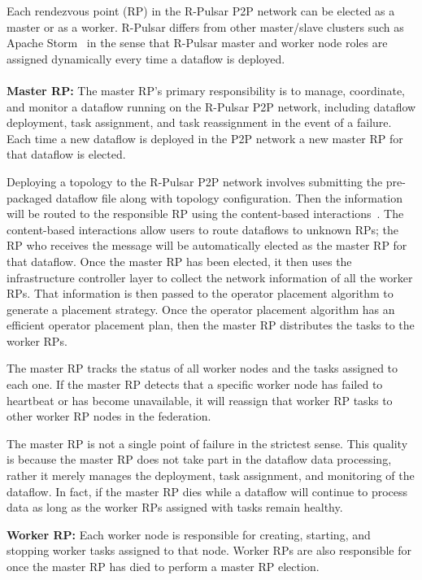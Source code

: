 Each rendezvous point (RP) in the R-Pulsar P2P network can be elected as a master or as a worker. R-Pulsar differs from other master/slave clusters such as Apache Storm~\cite{storm} in the sense that R-Pulsar master and worker node roles are assigned dynamically every time a dataflow is deployed. 
\\\\
\textbf{Master RP:}
The master RP's primary responsibility is to manage, coordinate, and monitor a dataflow running on the R-Pulsar P2P network, including dataflow deployment, task assignment, and task reassignment in the event of a failure. Each time a new dataflow is deployed in the P2P network a new master RP for that dataflow is elected.

Deploying a topology to the R-Pulsar P2P network involves submitting the pre-packaged dataflow file along with topology configuration. Then the information will be routed to the responsible RP using the content-based interactions~\cite{Renart2018EdgeBD}. The content-based interactions allow users to route dataflows to unknown RPs; the RP who receives the message will be automatically elected as the master RP for that dataflow. Once the master RP has been elected, it then uses the infrastructure controller layer to collect the network information of all the worker RPs. That information is then passed to the operator placement algorithm to generate a placement strategy. Once the operator placement algorithm has an efficient operator placement plan, then the master RP distributes the tasks to the worker RPs.

The master RP tracks the status of all worker nodes and the tasks assigned to each one. If the master RP detects that a specific worker node has failed to heartbeat or has become unavailable, it will reassign that worker RP tasks to other worker RP nodes in the federation.

The master RP is not a single point of failure in the strictest sense. This quality is because the master RP does not take part in the dataflow data processing, rather it merely manages the deployment, task assignment, and monitoring of the dataflow. In fact, if the master RP dies while a dataflow will continue to process data as long as the worker RPs assigned with tasks remain healthy. 

\textbf{Worker RP:} Each worker node is responsible for creating, starting, and stopping worker tasks assigned to that node. Worker RPs are also responsible for once the master RP has died to perform a master RP election.


